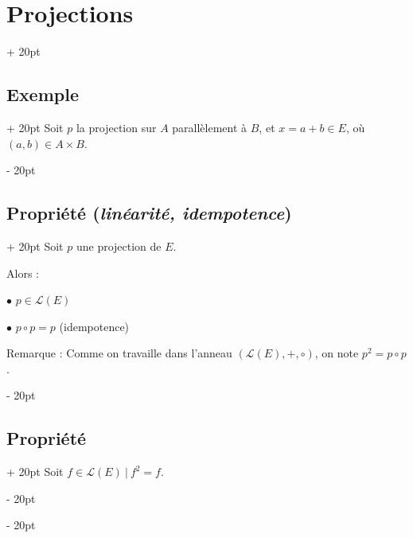 \documentclass[a4paper, 12pt, twoside]{article}
\newcommand{\ind}[1][20pt]{\advance\leftskip + #1}
\newcommand{\deind}[1][20pt]{\advance\leftskip - #1}
\newenvironment{indt}[2][20pt]{#2 \par \ind[#1]}{\par \deind} %
\begin{document}
\begin{indt}{\section{Projections}}
\begin{indt}{\subsection{Exemple}}
            Soit $p$ la projection sur $A$ parallèlement à $B$, et $x = a + b \in E$, où $(a, b) \in A \times B$.

            \begin{center}
            \end{center}
        \end{indt}

        \vspace{12pt}
        
        \begin{indt}{\subsection{Propriété (\textit{linéarité, idempotence})}}
            Soit $p$ une projection de $E$.

            Alors :

            $\bullet$ $p \in \mathcal L(E)$

            $\bullet$ $p \circ p = p$ (idempotence)

            \vspace{12pt}
            
            Remarque :
            Comme on travaille dans l'anneau $(\mathcal L(E), +, \circ)$, on note $p^2 = p \circ p$.
        \end{indt}

        \vspace{12pt}
        
        \begin{indt}{\subsection{Propriété}}
            Soit $f \in \mathcal L(E)\ |\ f^2 = f$.


\end{indt}
\end{indt}
\end{document}
